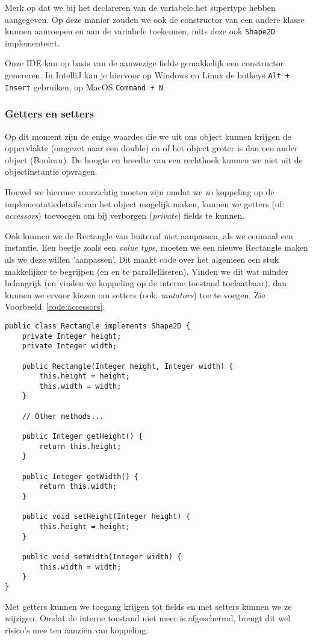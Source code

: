 Merk op dat we bij het declareren van de variabele het supertype hebben aangegeven.
Op deze manier zouden we ook de constructor van een andere klasse kunnen aanroepen 
en aan de variabele toekennen, mits deze ook \texttt{Shape2D} implementeert.

Onze IDE kan op basis van de aanwezige fields gemakkelijk een constructor genereren.
In IntelliJ kan je hiervoor op Windows en Linux de hotkeys \texttt{Alt + Insert} gebruiken, 
op MacOS \texttt{Command + N}.

\subsubsection{Getters en setters}
Op dit moment zijn de enige waardes die we uit ons object kunnen krijgen 
de oppervlakte (omgezet naar een double) en of het object groter is dan een ander object (Boolean).
De hoogte en breedte van een rechthoek kunnen we niet uit de objectinstantie opvragen.

Hoewel we hiermee voorzichtig moeten zijn omdat we zo koppeling op de 
implementatiedetails van het object mogelijk maken, kunnen we getters 
(of: \textit{accessors}) toevoegen 
om bij verborgen (\textit{private}) fields te kunnen.

Ook kunnen we de Rectangle van buitenaf niet aanpassen, als we eenmaal een instantie.
Een beetje zoals een \textit{value type}, moeten we een nieuwe Rectangle maken 
als we deze willen 'aanpassen'. Dit maakt code over het algemeen een stuk makkelijker 
te begrijpen (en en te parallelliseren). Vinden we dit wat minder belangrijk
(en vinden we koppeling op de interne toestand toelaatbaar), dan kunnen we 
ervoor kiezen om setters (ook: \textit{mutators}) toe te voegen. 
Zie Voorbeeld~\ref{code:accessors}.

\begin{listing}[ht]
\begin{verbatim}
public class Rectangle implements Shape2D {
    private Integer height;
    private Integer width;

    public Rectangle(Integer height, Integer width) {
        this.height = height;
        this.width = width;
    }

    // Other methods...

    public Integer getHeight() {
        return this.height;
    }

    public Integer getWidth() {
        return this.width;
    }

    public void setHeight(Integer height) {
        this.height = height;
    }

    public void setWidth(Integer width) {
        this.width = width;
    }
}
\end{verbatim}
\caption{Met getters kunnen we toegang krijgen tot fields en met setters kunnen we ze wijzigen.
Omdat de interne toestand niet meer is afgeschermd, 
brengt dit wel risico's mee ten aanzien van koppeling.}
\label{code:getters-setters}
\end{listing}

